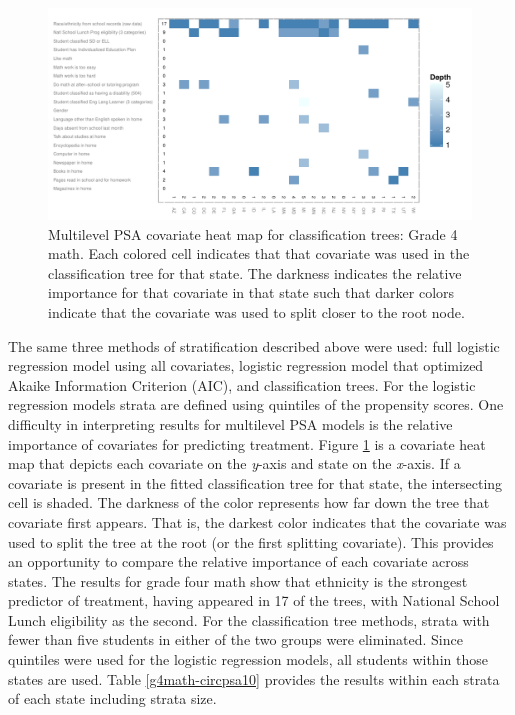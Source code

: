 \documentclass[letterpaper,12p,twoside]{article} %
\begin{document}
\begin{figure}[t]
\begin{center}
\includegraphics[width=\textwidth]{../Figures2009/g4math-mlpsa-ctree-heat.pdf}
\caption[Multilevel PSA covariate heat map for classification trees: Grade 4 math]{Multilevel PSA covariate heat map for classification trees: Grade 4 math. Each colored cell indicates that that covariate was used in the classification tree for that state. The darkness indicates the relative importance for that covariate in that state such that darker colors indicate that the covariate was used to split closer to the root node.}
\label{fig:g4math-mlpsa-ctree-heat}
\end{center}
\end{figure}

The same three methods of stratification described above were used: full logistic regression model using all covariates, logistic regression model that optimized Akaike Information Criterion (AIC), and classification trees. For the logistic regression models strata are defined using quintiles of the propensity scores. One difficulty in interpreting results for multilevel PSA models is the relative importance of covariates for predicting treatment. Figure \ref{fig:g4math-mlpsa-ctree-heat} is a covariate heat map that depicts each covariate on the \textit{y}-axis and state on the \textit{x}-axis. If a covariate is present in the fitted classification tree for that state, the intersecting cell is shaded. The darkness of the color represents how far down the tree that covariate first appears. That is, the darkest color indicates that the covariate was used to split the tree at the root (or the first splitting covariate). This provides an opportunity to compare the relative importance of each covariate across states. The results for grade four math show that ethnicity is the strongest predictor of treatment, having appeared in 17 of the trees, with National School Lunch eligibility as the second. For the classification tree methods, strata with fewer than five students in either of the two groups were eliminated. Since quintiles were used for the logistic regression models, all students within those states are used. Table \ref{g4math-circpsa10} provides the results within each strata of each state including strata size.
\end{document}
